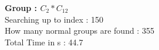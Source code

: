 \textbf{Group : $C_2*C_{12}$}\\
Searching up to index : 150\\
How many normal groups are found : 355\\
Total Time in s : 44.7\\
